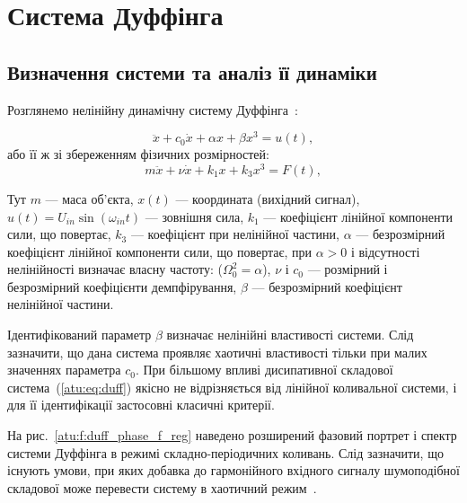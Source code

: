 
\FloatBarrier

\section{Система Дуффінга} %
\label{atu:sect:duff}


\subsection{Визначення системи та аналіз її динаміки} %

Розглянемо нелінійну динамічну систему Дуффінга~\cite{magni_theory_dyn_chaos,atu_asau12}:

\begin{equation}
 \ddot{x} + c_0 \dot{x} + \alpha x + \beta x^3 = u(t) ,
\label{atu:eq:duff}
\end{equation}
%
або її ж зі збереженням фізичних розмірностей:
%
\begin{equation}
 m \ddot{x} + \nu \dot{x} + k_1 x + k_3 x^3 = F(t) ,
\label{atu:eq:duff_phys}
\end{equation}

Тут
$ m $ --- маса об'єкта,
$ x (t) $ --- координата (вихідний сигнал),
$ u (t) = U_{in} \sin (\omega_{in} t) $ --- зовнішня сила,
$ k_1 $ --- коефіцієнт лінійної компоненти сили, що повертає,
$ k_3 $ --- коефіцієнт при нелінійної частини,
$ \alpha $ --- безрозмірний коефіцієнт лінійної компоненти сили, що повертає, при
$ \alpha> 0 $ і відсутності нелінійності визначає власну частоту: ($ \Omega_0^2 = \alpha $),
$ \nu $ і $ c_0 $ --- розмірний і безрозмірний коефіцієнти демпфірування,
$ \beta $ --- безрозмірний коефіцієнт нелінійної частини.

Ідентифікований параметр
$ \beta $ визначає нелінійні властивості системи. Слід зазначити,
що дана система проявляє хаотичні властивості тільки при малих
значеннях параметра \(c_0\). При більшому впливі дисипативної
складової система~(\ref{atu:eq:duff}) якісно не відрізняється від
лінійної коливальної системи, і для її ідентифікації застосовні
класичні критерії.


На рис.~\ref{atu:f:duff_phase_f_reg} наведено розширений фазовий портрет
і спектр системи Дуффінга в режимі складно-періодичних
коливань. Слід зазначити, що існують умови, при яких добавка до
гармонійного вхідного сигналу шумоподібної складової може
перевести систему в хаотичний режим~\cite{atu_asau15}.


